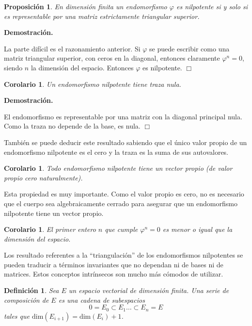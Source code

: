 \documentclass[a4paper,draft,12pt]{article}
\newtheorem{defi}{Definición}[section]%
\newtheorem{propo}[teo]{Proposición}%
\newtheorem{cor}[teo]{Corolario}%
\newcommand{\dem}{\noindent \textbf{Demostración. }\vspace{0.3 cm}}%
\newcommand{\fin}{ $\Box $ \vspace{0.4 cm}}
\newcommand{\df}[1]{\textsf{\color{blue}#1}}
\begin{document}
\begin{propo}

En dimensión finita un endomorfismo $\varphi$ es nilpotente si y solo si es representable por una matriz estrictamente triangular superior.

\end{propo}

\dem

La parte difícil es el razonamiento anterior. Si $\varphi$ se puede escribir como una matriz triangular superior, con ceros en la diagonal, entonces claramente $\varphi^n=0$, siendo $n$ la dimensión del espacio.  Entonces $\varphi$ es nilpotente.  \fin

\begin{cor}

Un endomorfismo nilpotente tiene traza nula.

\end{cor}

\dem

El endomorfismo es representable por una matriz con la diagonal principal nula.  Como la traza no depende de la base,  es nula.    \fin

También se puede deducir este resultado sabiendo que el único valor propio de un endomorfismo nilpotente es el cero y la traza es la suma de sus autovalores.

\begin{cor}

Todo endomorfismo nilpotente tiene un vector propio (de valor propio cero naturalmente).

\end{cor}

Esta propiedad es muy importante.  Como el valor propio es cero, no es necesario que el cuerpo sea algebraicamente cerrado para asegurar que un endomorfismo nilpotente tiene un vector propio.

\begin{cor}

El primer entero $n$ que cumple $\varphi^n=0$ es menor o igual que la dimensión del espacio.

\end{cor}

Los resultado referentes a la ``triangulación'' de los endomorfismos nilpotentes se pueden traducir a términos invariantes que  no dependan ni de bases ni de matrices.  Estos conceptos intrínsecos son mucho más cómodos de utilizar.

\begin{defi}

Sea $E$ un espacio vectorial de dimensión finita. Una  \df{serie de composición}  de $E$ es una cadena de subespacios
$$
0=E_0\subset E_1 \dots \subset E_n=E
$$
tales que $\text{dim}(E_{i+1})= \text{dim}(E_i)+1$.

\end{defi}
\end{document}
